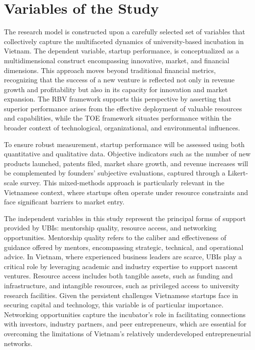 \documentclass[../Main.tex]{subfiles}
\begin{document}
    \section{Variables of the Study}
    The research model is constructed upon a carefully selected set of variables that collectively capture the multifaceted dynamics of university-based incubation in Vietnam. The dependent variable, startup performance, is conceptualized as a multidimensional construct encompassing innovative, market, and financial dimensions. This approach moves beyond traditional financial metrics, recognizing that the success of a new venture is reflected not only in revenue growth and profitability but also in its capacity for innovation and market expansion. The RBV framework supports this perspective by asserting that superior performance arises from the effective deployment of valuable resources and capabilities, while the TOE framework situates performance within the broader context of technological, organizational, and environmental influences.

    To ensure robust measurement, startup performance will be assessed using both quantitative and qualitative data. Objective indicators such as the number of new products launched, patents filed, market share growth, and revenue increases will be complemented by founders' subjective evaluations, captured through a Likert-scale survey. This mixed-methods approach is particularly relevant in the Vietnamese context, where startups often operate under resource constraints and face significant barriers to market entry.

    The independent variables in this study represent the principal forms of support provided by UBIs: mentorship quality, resource access, and networking opportunities. Mentorship quality refers to the caliber and effectiveness of guidance offered by mentors, encompassing strategic, technical, and operational advice. In Vietnam, where experienced business leaders are scarce, UBIs play a critical role by leveraging academic and industry expertise to support nascent ventures. Resource access includes both tangible assets, such as funding and infrastructure, and intangible resources, such as privileged access to university research facilities. Given the persistent challenges Vietnamese startups face in securing capital and technology, this variable is of particular importance. Networking opportunities capture the incubator's role in facilitating connections with investors, industry partners, and peer entrepreneurs, which are essential for overcoming the limitations of Vietnam's relatively underdeveloped entrepreneurial networks.
\end{document}
